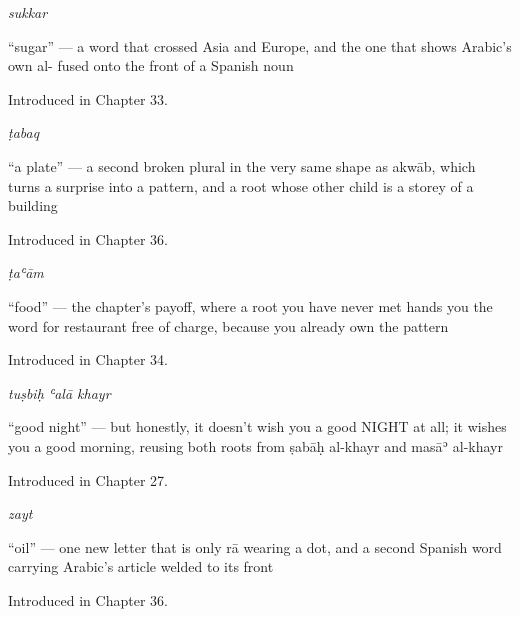 \noindent\begin{minipage}[t]{\linewidth}
\raggedright
\textbf{}\enspace\emph{sukkar}\par
\small \textquotedblleft{}sugar\textquotedblright{} — a word that crossed Asia and Europe, and the one that shows Arabic's own al- fused onto the front of a Spanish noun\par
\footnotesize Introduced in Chapter 33.
\end{minipage}\par\medskip

\noindent\begin{minipage}[t]{\linewidth}
\raggedright
\textbf{}\enspace\emph{ṭabaq}\par
\small \textquotedblleft{}a plate\textquotedblright{} — a second broken plural in the very same shape as akwāb, which turns a surprise into a pattern, and a root whose other child is a storey of a building\par
\footnotesize Introduced in Chapter 36.
\end{minipage}\par\medskip

\noindent\begin{minipage}[t]{\linewidth}
\raggedright
\textbf{}\enspace\emph{ṭaʿām}\par
\small \textquotedblleft{}food\textquotedblright{} — the chapter's payoff, where a root you have never met hands you the word for restaurant free of charge, because you already own the pattern\par
\footnotesize Introduced in Chapter 34.
\end{minipage}\par\medskip

\noindent\begin{minipage}[t]{\linewidth}
\raggedright
\textbf{  }\enspace\emph{tuṣbiḥ ʿalā khayr}\par
\small \textquotedblleft{}good night\textquotedblright{} — but honestly, it doesn't wish you a good NIGHT at all; it wishes you a good morning, reusing both roots from ṣabāḥ al-khayr and masāʾ al-khayr\par
\footnotesize Introduced in Chapter 27.
\end{minipage}\par\medskip

\noindent\begin{minipage}[t]{\linewidth}
\raggedright
\textbf{}\enspace\emph{zayt}\par
\small \textquotedblleft{}oil\textquotedblright{} — one new letter that is only rā wearing a dot, and a second Spanish word carrying Arabic's article welded to its front\par
\footnotesize Introduced in Chapter 36.
\end{minipage}\par\medskip

